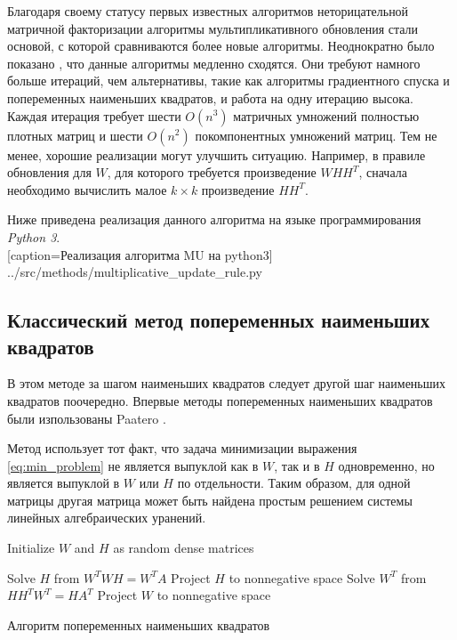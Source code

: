 Благодаря своему статусу первых известных алгоритмов неторицательной матричной факторизации
алгоритмы мультипликативного обновления стали основой,
с которой сравниваются более новые алгоритмы.
Неоднократно было показано \cite{langville}, что данные алгоритмы медленно сходятся.
Они требуют намного больше итераций, чем альтернативы, такие как алгоритмы градиентного спуска и попеременных наименьших квадратов, и работа на одну итерацию высока.
Каждая итерация требует шести $O(n^3)$ матричных умножений полностью плотных матриц и шести $O(n^2)$ покомпонентных умножений матриц.
Тем не менее, хорошие реализации могут улучшить ситуацию.
Например, в правиле обновления для $W$, для которого требуется произведение $WHH^T$, сначала необходимо вычислить малое $k \times k$ произведение $HH^T$.

\newpage

Ниже приведена реализация данного алгоритма на языке программирования \textit{Python 3}.
\\


  [caption=Реализация алгоритма MU на python3]
  {../src/methods/multiplicative_update_rule.py} \label{code:mu}



\newpage



\subsection{Классический метод попеременных наименьших квадратов}

В этом методе за шагом наименьших квадратов следует другой шаг наименьших квадратов поочередно.
Впервые методы попеременных наименьших квадратов были изпользованы Paatero \cite{paatero}.

Метод использует тот факт, что задача минимизации выражения \ref{eq:min_problem} не является выпуклой как в $W$,
так и в $H$ одновременно, но является выпуклой в $W$ или $H$ по отдельности.
Таким образом, для одной матрицы другая матрица может быть найдена простым решением системы линейных алгебраических уранений.

\begin{algorithm} \label{alg:als_solve}

  \BlankLine
  \BlankLine


  \BlankLine

  Initialize $W$ and $H$ as random dense matrices\;

   {
    Solve $H$ from $W^TWH=W^TA$\;
    Project $H$ to nonnegative space\;
    Solve $W^T$ from $HH^TW^T=HA^T$\;
    Project $W$ to nonnegative space\;
  }

  \BlankLine

  \caption{Алгоритм попеременных наименьших квадратов}
\end{algorithm}


